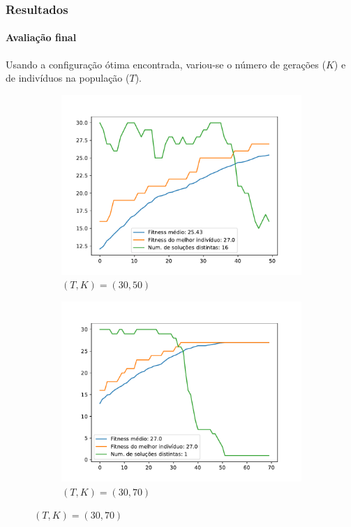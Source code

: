 \documentclass{beamer}
\begin{document}
	\begin{frame}
		\frametitle{Resultados}
		\framesubtitle{Avaliação final}
		Usando a configuração ótima encontrada, variou-se o número de gerações ($K$) e de indivíduos na população ($T$).
		
		\begin{figure}[!hb]
			\begin{subfigure}[b]{0.5\textwidth}
				\centering
				\includegraphics[width=\textwidth]{../relatorio/teste6_30_50.pdf}
				\caption{$(T,K)=(30,50)$}
			\end{subfigure}%
			\begin{subfigure}[b]{0.5\textwidth}
				\centering
				\includegraphics[width=\textwidth]{../relatorio/teste6_30_70.pdf}
				\caption{$(T,K)=(30,70)$}
			\end{subfigure}%
		\end{figure}
	\end{frame}
	
\end{document}
